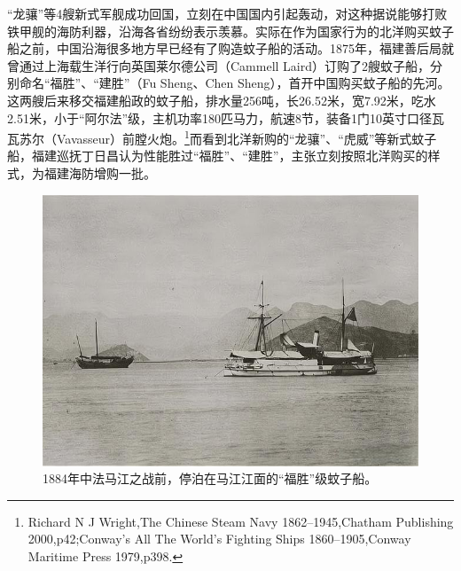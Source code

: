 \documentclass[12pt,UTF8]{ctexbook}
\begin{document}
“龙骧”等4艘新式军舰成功回国，立刻在中国国内引起轰动，对这种据说能够打败铁甲舰的海防利器，沿海各省纷纷表示羡慕。实际在作为国家行为的北洋购买蚊子船之前，中国沿海很多地方早已经有了购造蚊子船的活动。1875年，福建善后局就曾通过上海载生洋行向英国莱尔德公司（Cammell Laird）订购了2艘蚊子船，分别命名“福胜”、“建胜”（Fu Sheng、Chen Sheng），首开中国购买蚊子船的先河。这两艘后来移交福建船政的蚊子船，排水量256吨，长26.52米，宽7.92米，吃水2.51米，小于“阿尔法”级，主机功率180匹马力，航速8节，装备1门10英寸口径瓦瓦苏尔（Vavasseur）前膛火炮。\footnote{Richard N J Wright,The Chinese Steam Navy 1862--1945,Chatham Publishing 2000,p42;Conway's All The World's Fighting Ships 1860--1905,Conway Maritime Press 1979,p398.}而看到北洋新购的“龙骧”、“虎威”等新式蚊子船，福建巡抚丁日昌认为性能胜过“福胜”、“建胜”，主张立刻按照北洋购买的样式，为福建海防增购一批。

\begin{figure}[htbp]
	\centering
	\includegraphics[width=1\linewidth]{Images/9}
	\caption{1884年中法马江之战前，停泊在马江江面的“福胜”级蚊子船。}
	\label{fig:1}
\end{figure}
\end{document}
